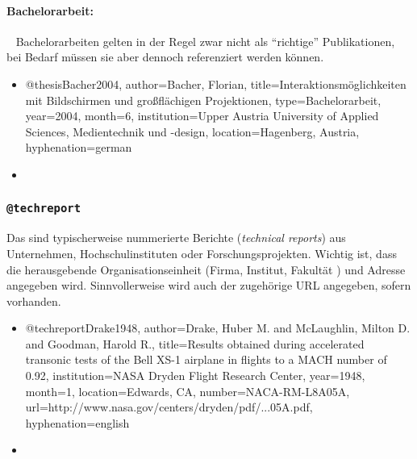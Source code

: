 
\paragraph{Bachelorarbeit:} ~ \newline
Bachelorarbeiten gelten in der Regel zwar nicht als "`richtige"' Publikationen, bei Bedarf müssen sie aber dennoch referenziert werden können. 
%
\begin{itemize}
\item[]
\begin{GenericCode}[numbers=none]
@thesis{Bacher2004,
  author={Bacher, Florian},
  title={Interaktionsmöglichkeiten mit Bildschirmen und großflächigen Projektionen},
  type={Bachelorarbeit},
  year={2004},
  month={6},
  institution={Upper Austria University of Applied Sciences, Medientechnik und {-design}},
  location={Hagenberg, Austria},
  hyphenation={german}
}
\end{GenericCode}
\item[\cite{Bacher2004}] 
\end{itemize}


\subsubsection{\texttt{@techreport}}
\label{sec:@techreport}
Das sind typischerweise nummerierte Berichte (\emph{technical reports}) aus Unternehmen, 
Hochschulinstituten oder Forschungsprojekten.
Wichtig ist, dass die herausgebende Organisationseinheit (Firma, Institut, Fakultät \etc) und 
Adresse angegeben wird. Sinnvollerweise wird auch der zugehörige URL angegeben, sofern vorhanden. 
%
\begin{itemize}
\item[]
\begin{GenericCode}[numbers=none]
@techreport{Drake1948,
  author={Drake, Huber M. and McLaughlin, Milton D. and Goodman, Harold R.},
  title={Results obtained during accelerated transonic tests of the {Bell} {XS-1} airplane in flights to a {MACH} number of 0.92},
  institution={NASA Dryden Flight Research Center},
  year={1948},
  month={1},
  location={Edwards, CA},
  number={NACA-RM-L8A05A},
  url={http://www.nasa.gov/centers/dryden/pdf/...05A.pdf},
  hyphenation={english}
}
\end{GenericCode}
\item[\cite{Drake1948}] 
\end{itemize}

